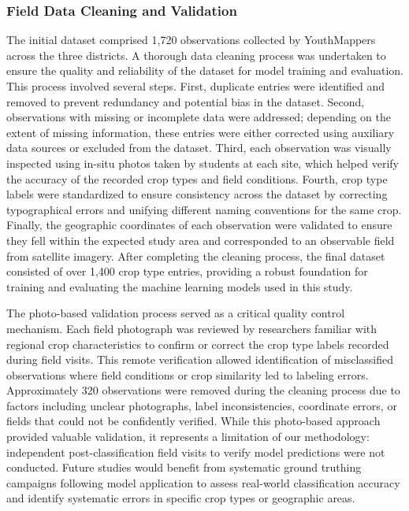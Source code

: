 \documentclass[
  journal,
  twocolumn]{IEEEtran}
\begin{document}
\subsubsection{Field Data Cleaning and
Validation}\label{field-data-cleaning-and-validation}

The initial dataset comprised 1,720 observations collected by
YouthMappers across the three districts. A thorough data cleaning
process was undertaken to ensure the quality and reliability of the
dataset for model training and evaluation. This process involved several
steps. First, duplicate entries were identified and removed to prevent
redundancy and potential bias in the dataset. Second, observations with
missing or incomplete data were addressed; depending on the extent of
missing information, these entries were either corrected using auxiliary
data sources or excluded from the dataset. Third, each observation was
visually inspected using in-situ photos taken by students at each site,
which helped verify the accuracy of the recorded crop types and field
conditions. Fourth, crop type labels were standardized to ensure
consistency across the dataset by correcting typographical errors and
unifying different naming conventions for the same crop. Finally, the
geographic coordinates of each observation were validated to ensure they
fell within the expected study area and corresponded to an observable
field from satellite imagery. After completing the cleaning process, the
final dataset consisted of over 1,400 crop type entries, providing a
robust foundation for training and evaluating the machine learning
models used in this study.

The photo-based validation process served as a critical quality control
mechanism. Each field photograph was reviewed by researchers familiar
with regional crop characteristics to confirm or correct the crop type
labels recorded during field visits. This remote verification allowed
identification of misclassified observations where field conditions or
crop similarity led to labeling errors. Approximately 320 observations
were removed during the cleaning process due to factors including
unclear photographs, label inconsistencies, coordinate errors, or fields
that could not be confidently verified. While this photo-based approach
provided valuable validation, it represents a limitation of our
methodology: independent post-classification field visits to verify
model predictions were not conducted. Future studies would benefit from
systematic ground truthing campaigns following model application to
assess real-world classification accuracy and identify systematic errors
in specific crop types or geographic areas.
\end{document}
